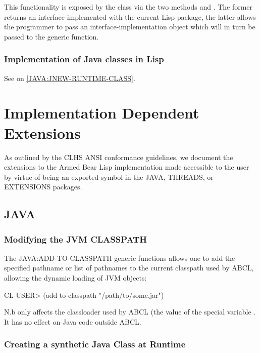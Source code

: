 \documentclass[10pt]{book}
\begin{document}
This functionality is exposed by the class  via
the two methods  and
. The former returns an interface
implemented with the current Lisp package, the latter allows the
programmer to pass an interface-implementation object which will in turn
be passed to the  generic function.

\subsection{Implementation of Java classes in Lisp}

See  on \ref{JAVA:JNEW-RUNTIME-CLASS}.


\chapter{Implementation Dependent Extensions}

As outlined by the CLHS ANSI conformance guidelines, we document the
extensions to the Armed Bear Lisp implementation made accessible to
the user by virtue of being an exported symbol in the JAVA, THREADS,
or EXTENSIONS packages.

\section{JAVA}

\subsection{Modifying the JVM CLASSPATH}

The JAVA:ADD-TO-CLASSPATH generic functions allows one to add the
specified pathname or list of pathnames to the current classpath
used by ABCL, allowing the dynamic loading of JVM objects:

\begin{listing-lisp}
CL-USER> (add-to-classpath "/path/to/some.jar")
\end{listing-lisp}

N.b  only affects the classloader used by ABCL
(the value of the special variable . It has
no effect on Java code outside ABCL.

\subsection{Creating a synthetic Java Class at Runtime}
\end{document}
